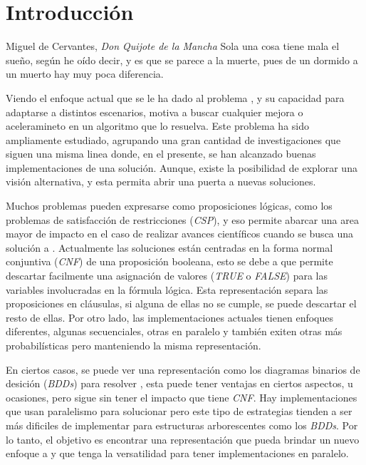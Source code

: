 \chapter{Introducción}

\begin{chapquote}{Miguel de Cervantes, \textit{Don Quijote de la Mancha}}
Sola una cosa tiene mala el sueño, según he oído decir, y es que se parece a la muerte, pues de un dormido a un muerto hay muy poca diferencia.
\end{chapquote}

Viendo el enfoque actual que se le ha dado al problema \sat, y su capacidad para adaptarse a distintos escenarios, motiva a buscar cualquier mejora o aceleramineto en un algoritmo que lo resuelva. Este problema ha sido ampliamente estudiado, agrupando una gran cantidad de investigaciones que siguen una misma linea donde, en el presente, se han alcanzado buenas implementaciones de una solución. Aunque, existe la posibilidad de explorar una visión alternativa, y esta permita abrir una puerta a nuevas soluciones.

Muchos problemas pueden expresarse como proposiciones lógicas, como los problemas de satisfacción de restricciones (\textit{CSP}), y eso permite abarcar una area mayor de impacto en el caso de realizar avances científicos cuando se busca una solución a \sat. Actualmente las soluciones están centradas en la forma normal conjuntiva (\textit{CNF}) de una proposición booleana, esto se debe a que permite descartar facilmente una asignación de valores (\textit{TRUE} o \textit{FALSE}) para las variables involucradas en la fórmula lógica. Esta representación separa las proposiciones en cláusulas, si alguna de ellas no se cumple, se puede descartar el resto de ellas. Por otro lado, las implementaciones actuales tienen enfoques diferentes, algunas secuenciales, otras en paralelo y también exiten otras más probabilísticas pero manteniendo la misma representación.

En ciertos casos, se puede ver una representación como los diagramas binarios de desición (\textit{BDDs}) para resolver \sat, esta puede tener ventajas en ciertos aspectos, u ocasiones, pero sigue sin tener el impacto que tiene \textit{CNF}. Hay implementaciones que usan paralelismo para solucionar \sat pero este tipo de estrategias tienden a ser más dificiles de implementar para estructuras arborescentes como los \textit{BDDs}. Por lo tanto, el objetivo es encontrar una representación que pueda brindar un nuevo enfoque a \sat y que tenga la versatilidad para tener implementaciones en paralelo.

